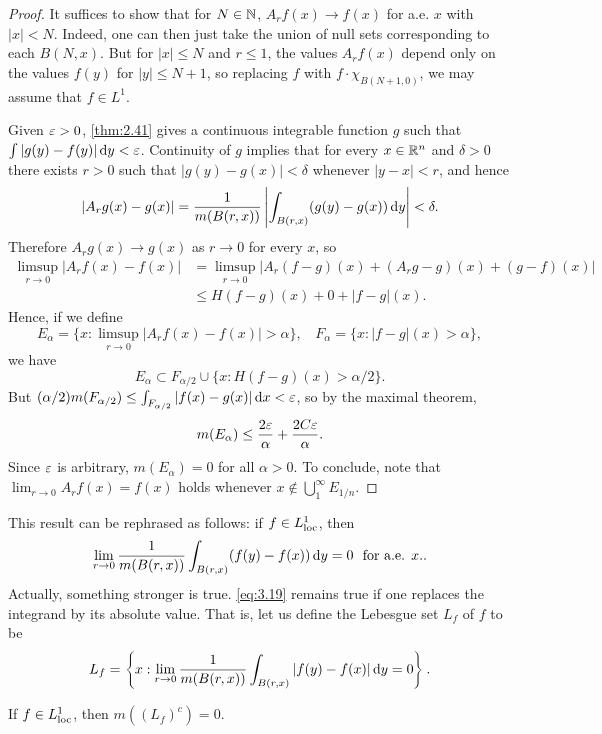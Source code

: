 \documentclass[12pt]{article} %
\begin{document}
\begin{proof}
    It suffices to show that for $N \in \mathbb{N}$, $A_r f(x) \to f(x)$ for a.e. $x$ with $|x| < N$. Indeed, one can then just take the union of null sets corresponding to each $B(N, x)$. But for $|x| \leq N$ and $r \leq 1$, the values $A_r f(x)$ depend only on the values $f(y)$ for $|y| \leq N+1$, so replacing $f$ with $f \cdot \chi_{B(N+1, 0)}$, we may assume that $f \in L^1$.

    Given $\varepsilon > 0$, \cref{thm:2.41} gives a continuous integrable function $g$ such that $\int|g(y) - f(y)|\, \mathrm{d} y < \varepsilon$. Continuity of $g$ implies that for every $x \in \mathbb{R}^n$ and $\delta > 0$ there exists $r > 0$ such that $|g(y) - g(x)| < \delta$ whenever $|y-x| < r$, and hence \[|A_r g(x) - g(x)| = \frac{1}{m(B(r, x))} \left|\int_{B(r, x)} (g(y) - g(x)) \, \mathrm{d} y \right| < \delta.\] Therefore $A_r g(x) \to g(x)$ as $r \to 0$ for every $x$, so \begin{align*}
        \limsup_{r \to 0} | A_r f(x) - f(x) | &= \limsup_{r \to 0} |A_r(f - g)(x) + (A_r g - g)(x) + (g-f)(x)|\\
        &\leq H(f-g)(x) + 0 + |f-g|(x).
    \end{align*}
    Hence, if we define \[E_\alpha = \{x : \limsup_{r \to 0} |A_r f(x) - f(x)| > \alpha\}, \ \ \ \ F_\alpha = \{x : |f-g|(x) > \alpha\},\] we have \[E_\alpha \subset F_{\alpha / 2} \cup \{x : H(f-g)(x) > \alpha / 2\}.\] But $(\alpha / 2)m(F_{\alpha / 2}) \leq \int_{F_{\alpha/2}} |f(x) - g(x)| \, \mathrm{d} x < \varepsilon$, so by the maximal theorem, \[m(E_\alpha) \leq \frac{2\varepsilon}{\alpha} + \frac{2C\varepsilon}{\alpha}.\] Since $\varepsilon$ is arbitrary, $m(E_\alpha) = 0$ for all $\alpha > 0$. To conclude, note that $\lim_{r \to 0} A_r f(x) = f(x)$ holds whenever $x \notin \bigcup_1^\infty E_{1/n}$.
\end{proof}

This result can be rephrased as follows: if $f \in L_{\operatorname{loc}}^1$, then \begin{align}\label{eq:3.19}
    \lim_{r \to 0} \frac{1}{m(B(r, x))} \int_{B(r, x)} (f(y) - f(x))\, \mathrm{d} y = 0 \ \ \text{for a.e. $x$.}.
\end{align} Actually, something stronger is true. \cref{eq:3.19} remains true if one replaces the integrand by its absolute value. That is, let us define the Lebesgue set $L_f$ of $f$ to be \[L_f = \left\{ x : \lim_{r\to 0} \frac{1}{m(B(r, x))} \int_{B(r, x)} |f(y) - f(x)| \, \mathrm{d} y = 0 \right\}.\]

\begin{theorem}\label{thm:3.20}
    If $f \in L_{\operatorname{loc}}^1$, then $m((L_f)^c) = 0$.
\end{theorem}
\end{document}
